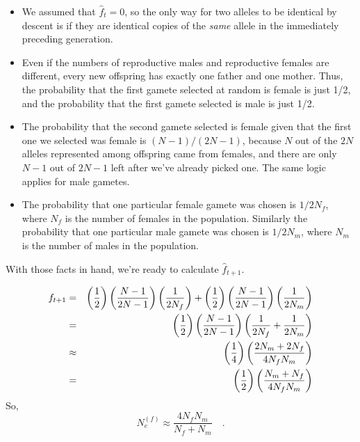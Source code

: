 \documentclass[12pt]{article}
\begin{document}
\begin{itemize}

\item We assumed that $\hat f_t = 0$, so the only way for two alleles
to be identical by descent is if they are identical copies of the {\it
same\/} allele in the immediately preceding generation.

\item Even if the numbers of reproductive males and reproductive
  females are different, every new offspring has exactly one father
  and one mother. Thus, the probability that the first gamete selected
  at random is female is just 1/2, and the probability that the first
  gamete selected is male is just 1/2.

\item The probability that the second gamete selected is female given
  that the first one we selected was female is $(N-1)/(2N-1)$, because
  $N$ out of the $2N$ alleles represented among offspring came from
  females, and there are only $N-1$ out of $2N-1$ left after we've
  already picked one. The same logic applies for male gametes.

\item The probability that one particular female gamete was chosen is
  $1/2N_f$, where $N_f$ is the number of females in the
  population. Similarly the probability that one particular male
  gamete was chosen is $1/2N_m$, where $N_m$ is the number of males in
  the population.

\end{itemize}

\noindent With those facts in hand, we're ready to calculate $\hat
f_{t+1}$.

\begin{eqnarray*}
f_{t+1} &=& \left(\frac{1}{2}\right) \left(\frac{N-1}{2N-1}\right)
            \left(\frac{1}{2N_f}\right) +
            \left(\frac{1}{2}\right) \left(\frac{N-1}{2N-1}\right)
            \left(\frac{1}{2N_m}\right) \\
        &=& \left(\frac{1}{2}\right) \left(\frac{N-1}{2N-1}\right)
            \left(\frac{1}{2N_f} + \frac{1}{2N_m}\right) \\
        &\approx& \left(\frac{1}{4}\right)
            \left(\frac{2N_m + 2N_f}{4N_fN_m}\right) \\
        &=& \left(\frac{1}{2}\right)
            \left(\frac{N_m + N_f}{4N_fN_m}\right)
\end{eqnarray*}
So,
\[
N_e^{(f)} \approx \frac{4N_fN_m}{N_f + N_m} \quad .
\]
\end{document}
